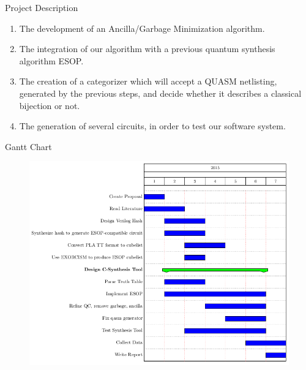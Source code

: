 \documentclass[pdf]{beamer}
\begin{document}
\begin{frame}{Project Description}
\begin{enumerate}
    \item The development of an Ancilla/Garbage Minimization algorithm.
    \item The integration of our algorithm with a previous quantum synthesis algorithm ESOP.
    \item The creation of a categorizer which will accept a QUASM netlisting, generated by the previous steps, and decide whether it describes a classical bijection or not. 
    \item The generation of several circuits, in order to test our software system. 
\end{enumerate}
\end{frame}

\begin{frame}{Gantt Chart}

\begin{figure}[ht]
\begin{center}
\hspace{-4em}
  \includegraphics[scale=0.35]{figures/our_gantt.png}
\end{center}
\end{figure}

\end{frame}
\end{document}
